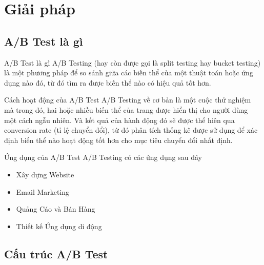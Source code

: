 \section{Giải pháp}

\subsection{A/B Test là gì}

\begin{frame}{A/B Test là gì}
	\alert{A/B Testing} (hay còn được gọi là split testing hay bucket testing) là một phương pháp để so sánh giữa các biến thể của một thuật toán hoặc ứng dụng nào đó, từ đó tìm ra được biến thể nào có hiệu quả tốt hơn.
\end{frame}


\begin{frame}{Cách hoạt động của A/B Test}
	\alert{A/B Testing} về cơ bản là một cuộc thử nghiệm mà trong đó, hai hoặc nhiều biến thể của trang được hiển thị cho người dùng một cách ngẫu nhiên. Và kết quả của hành động đó sẽ được thể hiên qua conversion rate (tỉ lệ chuyển đổi), từ đó phân tích thống kê được sử dụng để xác định biến thể nào hoạt động tốt hơn cho mục tiêu chuyển đổi nhất định.
\end{frame}


\begin{frame}{Ứng dụng của A/B Test}
	\alert{A/B Testing} có các ứng dụng sau đây
	\begin{itemize}
		\item Xây dựng Website
		\item Email Marketing
		\item Quảng Cáo và Bán Hàng
		\item Thiết kế Ứng dụng di động
	\end{itemize}
\end{frame}

\subsection{Cấu trúc A/B Test}


